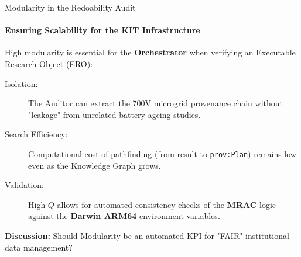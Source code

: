 \documentclass[aspectratio=169]{beamer}
\begin{document}
\begin{frame}{Modularity in the Redoability Audit}
    \framesubtitle{Ensuring Scalability for the KIT Infrastructure}
    
    High modularity is essential for the \textbf{Orchestrator} when verifying an Executable Research Object (ERO):

    \begin{description}
        \item[Isolation:] The Auditor can extract the 700V microgrid provenance chain without "leakage" from unrelated battery ageing studies.
        \item[Search Efficiency:] Computational cost of pathfinding (from result to \texttt{prov:Plan}) remains low even as the Knowledge Graph grows.
        \item[Validation:] High $Q$ allows for automated consistency checks of the \textbf{MRAC} logic against the \textbf{Darwin ARM64} environment variables.
    \end{description}

    \vfill
    \centering
    \textbf{Discussion:} Should Modularity be an automated KPI for "FAIR" institutional data management?
\end{frame}
\end{document}
